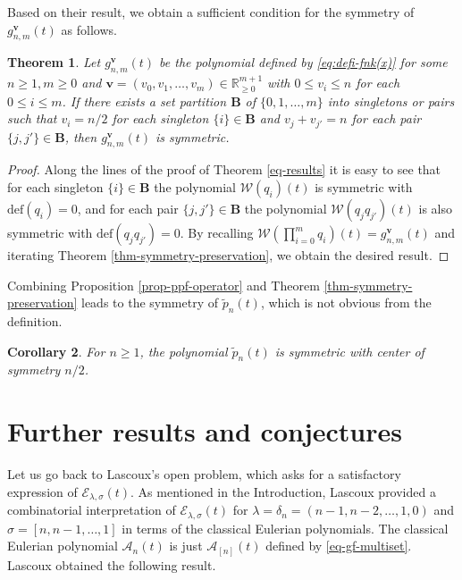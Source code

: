 \documentclass[12pt]{article}
\newtheorem{thm}{Theorem}[section]
\newtheorem{cor}[thm]{Corollary}
\newcommand{\PPP}{\tilde{p}}
\numberwithin{equation}{section}
\begin{document}
Based on their result, we obtain a sufficient condition for the symmetry of $g^{\mathbf{v}}_{n,m}(t)$ as follows. 

\begin{thm}\label{symmetry-thm}
Let $g^{\mathbf{v}}_{n,m}(t)$ be the polynomial defined by \eqref{eq:defi-fnk(x)} for some $n\geq 1, m\geq 0$ and $\mathbf{v} = (v_0, v_1, \ldots, v_m)\in \mathbb{R}_{\geq 0}^{m+1}$ with $0\le v_i\le n$ for each $0\leq i\leq m$.
If there exists a set partition $\mathbf{B}$ of 
$\{0,1,\ldots,m\}$ into singletons or pairs such that $v_i={n}/{2}$ for each singleton $\{i\}\in \mathbf{B}$ and 
$v_{j}+v_{j'}=n$ for each pair $\{j,j'\}\in \mathbf{B}$, then $g^{\mathbf{v}}_{n,m}(t)$ is symmetric.
\end{thm}

\begin{proof}
Along the lines of the proof of Theorem \ref{eq-results} it is easy to see that 
for each singleton $\{i\}\in \mathbf{B}$ the polynomial $\mathcal{W}\left(q_i\right)(t)$ is symmetric with $\mathrm{def}(q_i)=0$, 
and for each pair $\{j,j'\}\in \mathbf{B}$ the polynomial $\mathcal{W}(q_{j}q_{j'})(t)$ is also symmetric with $\mathrm{def}(q_{j}q_{j'})=0$. 
By recalling $\mathcal W\!\left(\prod_{i=0}^m q_i\right)(t)=g^{\mathbf v}_{n,m}(t)$ and iterating Theorem \ref{thm-symmetry-preservation}, we obtain the desired result.
\end{proof}

Combining Proposition \ref{prop-ppf-operator} and Theorem \ref{thm-symmetry-preservation} leads to the symmetry of 
$\PPP_n(t)$, which is not obvious from the definition. 

\begin{cor}
For $n\geq 1$, the polynomial $\PPP_n(t)$ is symmetric with center of symmetry $n/2$.
\end{cor}

\section{Further results and conjectures}\label{sec 6}

Let us go back to Lascoux's open problem, which asks for a satisfactory expression of ${\mathcal{E}}_{\lambda,\sigma}(t)$.
As mentioned in the Introduction, Lascoux \cite{Lascoux-2016}  provided a combinatorial interpretation of  ${\mathcal{E}}_{\lambda,\sigma}(t)$
for $\lambda=\delta_n=(n-1,n-2,\ldots,1,0)$ and $\sigma=[n,n-1,\ldots,1]$ in terms of the classical Eulerian polynomials. 
The classical Eulerian polynomial $\mathcal{A}_n(t)$ is just $\mathcal{A}_{[n]}(t)$ defined by \eqref{eq-gf-multiset}.
Lascoux obtained the following result. 
\end{document}
